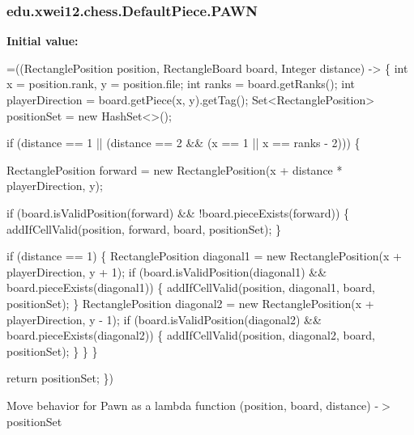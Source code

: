 \subsubsection[{\texorpdfstring{P\+A\+WN}{PAWN}}]{\setlength{\rightskip}{0pt plus 5cm}edu.\+xwei12.\+chess.\+Default\+Piece.\+P\+A\+WN}\hypertarget{enumedu_1_1xwei12_1_1chess_1_1_default_piece_a04edb1ff8e7cad1370b4fcdde10e48a5}{}\label{enumedu_1_1xwei12_1_1chess_1_1_default_piece_a04edb1ff8e7cad1370b4fcdde10e48a5}
{\bfseries Initial value\+:}
\begin{DoxyCode}
=((RectanglePosition position, RectangleBoard board, Integer distance) -> \{
        \textcolor{keywordtype}{int} x = position.rank, y = position.file;
        \textcolor{keywordtype}{int} ranks = board.getRanks();
        \textcolor{keywordtype}{int} playerDirection = board.getPiece(x, y).getTag();
        Set<RectanglePosition> positionSet = \textcolor{keyword}{new} HashSet<>();

        
        \textcolor{keywordflow}{if} (distance == 1 || (distance == 2 && (x == 1 || x == ranks - 2))) \{

            RectanglePosition forward = \textcolor{keyword}{new} RectanglePosition(x + distance * playerDirection, y);
            
            \textcolor{keywordflow}{if} (board.isValidPosition(forward) && !board.pieceExists(forward)) \{
                addIfCellValid(position, forward, board, positionSet);
            \}

            
            \textcolor{keywordflow}{if} (distance == 1) \{
                RectanglePosition diagonal1 = \textcolor{keyword}{new} RectanglePosition(x + playerDirection, y + 1);
                \textcolor{keywordflow}{if} (board.isValidPosition(diagonal1) && board.pieceExists(diagonal1)) \{
                    addIfCellValid(position, diagonal1, board, positionSet);
                \}
                RectanglePosition diagonal2 = \textcolor{keyword}{new} RectanglePosition(x + playerDirection, y - 1);
                \textcolor{keywordflow}{if} (board.isValidPosition(diagonal2) && board.pieceExists(diagonal2)) \{
                    addIfCellValid(position, diagonal2, board, positionSet);
                \}
            \}
        \}

        \textcolor{keywordflow}{return} positionSet;
    \})
\end{DoxyCode}
Move behavior for Pawn as a lambda function (position, board, distance) -\/$>$ position\+Set 
